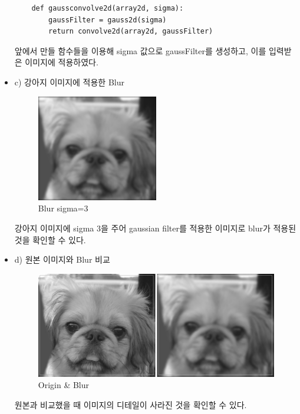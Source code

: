 \documentclass[]{report}
\begin{document}
\begin{itemize}
	\begin{lstlisting}
	def gaussconvolve2d(array2d, sigma):
		gaussFilter = gauss2d(sigma)
		return convolve2d(array2d, gaussFilter)
	\end{lstlisting}

	앞에서 만들 함수들을 이용해 sigma 값으로 gaussFilter를 생성하고, 이를 입력받은 이미지에 적용하였다. \\
	
	\item c) 강아지 이미지에 적용한 Blur
	
	\begin{figure}[ht!]
		\centering
		\includegraphics[width=0.5\textwidth]{image/dogGreyBlur.png}
		\caption{Blur sigma=3}
		\label{dogGreyBlur}
	\end{figure}
	강아지 이미지에 sigma 3을 주어 gaussian filter를 적용한 이미지로 blur가 적용된 것을 확인할 수 있다. \\
	
	\item d) 원본 이미지와 Blur 비교
	\begin{figure}[ht!]
		\centering
		\includegraphics[width=1\textwidth]{image/dogAndBlur.jpg}
		\caption{Origin \& Blur}
		\label{dogAndBlur}
	\end{figure}
	
	원본과 비교했을 때 이미지의 디테일이 사라진 것을 확인할 수 있다. \\
	
\end{itemize}
\end{document}
